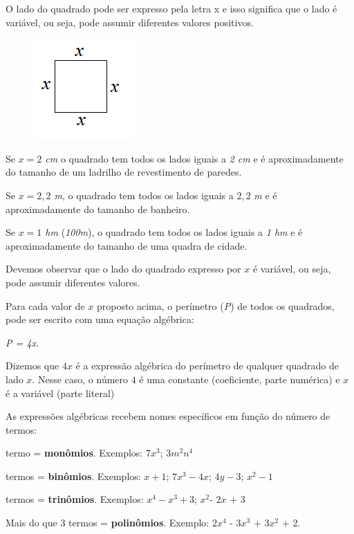 \settowidth{}
\begin{description}[leftmargin=\dimexpr\widest+\labelsep\relax,labelindent=0pt,
    labelwidth=\widest]
\item[\textbf{Exemplo~\thesubsection.\theexemplo~-}]

\noindent O lado do quadrado pode ser expresso pela letra  x  e isso significa que o lado é variável, ou seja, pode assumir diferentes valores positivos.

\begin{figure}[h]
\includegraphics{capitulos/expressoes_algebricas/media/image2.png}
\centering
\end{figure}

\noindent Se \textit{$x = 2$ cm} o quadrado tem todos os lados iguais a \textit{2 cm} e é aproximadamente do tamanho de um ladrilho de revestimento de paredes.

\noindent Se \textit{$x = 2,2$ m}, o quadrado tem todos os lados iguais a $2,2$ \textit{m} e é aproximadamente do tamanho de banheiro.

\noindent Se \textit{$x = 1$ hm} (\textit{100m}), o quadrado tem todos os lados iguais a \textit{1 hm} e é aproximadamente do tamanho de uma quadra de cidade.

\noindent Devemos observar que o lado do quadrado expresso por $x$ é variável, ou seja, pode assumir diferentes valores.

\noindent Para cada valor de $x$ proposto acima, o perímetro (\textit{P}) de todos os quadrados, pode ser escrito com uma equação algébrica:

\begin{center}
\textit{P = 4x.}
\end{center}

\noindent Dizemos que $4x$ é a expressão algébrica do perímetro de qualquer quadrado de lado $x$. Nesse caso, o número $4$ é uma constante (coeficiente, parte numérica) e $x$ é a variável (parte literal) \qedsymbol

\noindent As expressões algébricas recebem nomes específicos em função do número de termos:

\setlength{\parskip}{.5em}
 termo = \textbf{monômios}. Exemplos: $7x^3$; $3m^2n^4$\par
\setlength{\parskip}{0em}
 termos = \textbf{binômios}. Exemplos:  $x+1$; $7x^3 -4x$; $4y - 3$; $x^2 - 1$\par
{} termos = \textbf{trinômios}. Exemplos: $x^4 - x^3 + 3$; $x^2$- $2x$ + 3\par
\noindent Mais do que 3 termos = \textbf{polinômios}. Exemplo: $2x^4$ - $3x^3$ + $3x^2$ + 2.

\end{description}

